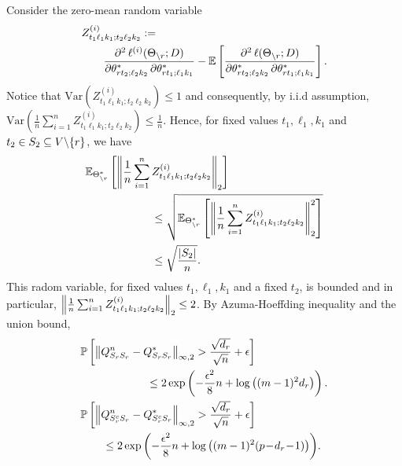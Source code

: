 \noindent Consider the zero-mean random variable
\begin{equation}
\begin{aligned}
&Z^{(i)}_{t_1\ell_1k_1;t_2\ell_2k_2}:=\\
&\qquad\frac{\partial^2\, \ell^{(i)}(\Theta_{\backslash r}; D)}{\partial\theta^*_{r t_2;\ell_2 k_2}\, \partial\theta^*_{r t_1;\ell_1 k_1}}-\mathbb{E}\left[\frac{\partial^2\, \ell(\Theta_{\backslash r}; D)}{\partial\theta^*_{r t_2;\ell_2 k_2}\, \partial\theta^*_{r t_1;\ell_1 k_1}}\right].
\end{aligned}
\nonumber
\end{equation}
\noindent Notice that $\text{Var}\left(Z^{(i)}_{t_1\ell_1k_1;t_2\ell_2k_2}\right)\leq 1$ and consequently, by i.i.d assumption, $\text{Var}\left(\frac{1}{n}\sum_{i=1}^nZ^{(i)}_{t_1\ell_1k_1;t_2\ell_2k_2}\right)\leq \frac{1}{n}$. Hence, for fixed values $t_1,\ell_1,k_1$ and $t_2\in S_2\subseteq V\backslash\{r\}$, we have
\begin{equation}
\begin{aligned}
&\mathbb{E}_{\Theta^*_{\backslash r}}\left[\left\|\frac{1}{n}\sum_{i=1}^nZ^{(i)}_{t_1\ell_1k_1;t_2\ell_2k_2}\right\|_{2}\right]\\
&\qquad\qquad\qquad\leq\sqrt{\mathbb{E}_{\Theta^*_{\backslash r}}\left[\left\|\frac{1}{n}\sum_{i=1}^nZ^{(i)}_{t_1\ell_1k_1;t_2\ell_2k_2}\right\|_{2}^2\right]}\\
&\qquad\qquad\qquad\leq\sqrt{\frac{|S_2|}{n}}.
\end{aligned}
\label{eq1}
\end{equation}
This radom variable, for fixed values $t_1,\ell_1,k_1$ and a fixed $t_2$, is bounded and in particular, $\left\|\frac{1}{n}\sum_{i=1}^nZ^{(i)}_{t_1\ell_1k_1;t_2\ell_2k_2}\right\|_{2}\leq 2$. By Azuma-Hoeffding inequality and the union bound,
\begin{equation}
\begin{aligned}
&\mathbb{P}\left[\left\|Q^n_{S_{r}S_{r}} -Q^*_{S_{r}S_{r}}\right\|_{\infty,2}>\frac{\sqrt{d_{r}}}{\sqrt{n}}+\epsilon\right]\\
&\qquad\qquad\qquad\leq 2\exp\left(-\frac{\epsilon^2}{8}n+\log\left((m-1)^2d_{r}\right)\right).\\
&\mathbb{P}\left[\left\|Q^n_{S_{r}^cS_{r}} -Q^*_{S_{r}^cS_{r}}\right\|_{\infty,2}>\frac{\sqrt{d_{r}}}{\sqrt{n}}+\epsilon\right]\\
&\qquad\leq 2\exp\left(-\frac{\epsilon^2}{8}n+\log\left((m-1)^2(p\!-\!d_{r}\!-\!1)\right)\right)\!.\\
\end{aligned}
\label{fisher_inf_1_bound1}
\end{equation}
